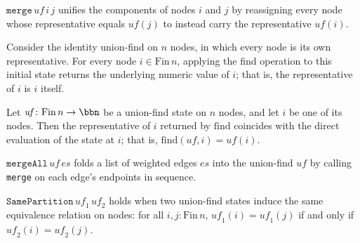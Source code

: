 \begin{definition}
\label{Kruskal.UF.merge}
\leanok
{}
$\mathtt{merge}\,\mathit{uf}\,i\,j$ unifies the components of nodes $i$ and
$j$ by reassigning every node whose representative equals $\mathit{uf}(j)$ to
instead carry the representative $\mathit{uf}(i)$.
\end{definition}

\begin{lemma}
\label{Kruskal.UF.init_find}
\leanok
{}
Consider the identity union-find on $n$ nodes, in which every node is its own
representative. For every node $i \in \mathrm{Fin}\,n$, applying the find operation to
this initial state returns the underlying numeric value of $i$; that is, the
representative of $i$ is $i$ itself.
\end{lemma}

\begin{lemma}
\label{Kruskal.UF.find_def}
\leanok
{}
Let $\mathit{uf} \colon \mathrm{Fin}\,n \to \bbn$ be a union-find state on $n$ nodes,
and let $i$ be one of its nodes. Then the representative of $i$ returned by
$\mathrm{find}$ coincides with the direct evaluation of the state at $i$; that is,
$\mathrm{find}(\mathit{uf}, i) = \mathit{uf}(i)$.
\end{lemma}

\begin{definition}
\label{Kruskal.UF.mergeAll}
\leanok
{}
$\mathtt{mergeAll}\,\mathit{uf}\,\mathit{es}$ folds a list of weighted edges
$\mathit{es}$ into the union-find $\mathit{uf}$ by calling \texttt{merge} on
each edge's endpoints in sequence.
\end{definition}

\begin{definition}
\label{Kruskal.UF.SamePartition}
\leanok
{}
$\mathtt{SamePartition}\,\mathit{uf}_1\,\mathit{uf}_2$ holds when two
union-find states induce the same equivalence relation on nodes: for all
$i, j : \mathrm{Fin}\,n$, $\mathit{uf}_1(i) = \mathit{uf}_1(j)$ if and
only if $\mathit{uf}_2(i) = \mathit{uf}_2(j)$.
\end{definition}

